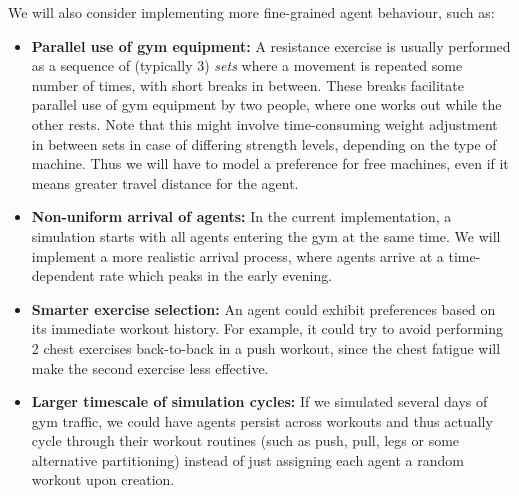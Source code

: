\documentclass[9pt]{pnas-new}
\begin{document}
We will also consider implementing more fine-grained agent behaviour, such as:
\begin{itemize}
	\item {\bf Parallel use of gym equipment:} A resistance exercise is usually performed as a sequence of (typically 3) {\it sets} where a movement is repeated some number of times, with short breaks in between. These breaks facilitate parallel use of gym equipment by two people, where one works out while the other rests. Note that this might involve time-consuming weight adjustment in between sets in case of differing strength levels, depending on the type of machine. Thus we will have to model a preference for free machines, even if it means greater travel distance for the agent.
	\item {\bf Non-uniform arrival of agents:} In the current implementation, a simulation starts with all agents entering the gym at the same time. We will implement a more realistic arrival process, where agents arrive at a time-dependent rate which peaks in the early evening.
	\item {\bf Smarter exercise selection:} An agent could exhibit preferences based on its immediate workout history. For example, it could try to avoid performing 2 chest exercises back-to-back in a push workout, since the chest fatigue will make the second exercise less effective.
	\item {\bf Larger timescale of simulation cycles:} If we simulated several days of gym traffic, we could have agents persist across workouts and thus actually cycle through their workout routines (such as push, pull, legs or some alternative partitioning) instead of just assigning each agent a random workout upon creation.
\end{itemize}


\showacknow %


\begin{multicols}{2}
\section*{\bibname}

\end{multicols}
\end{document}
